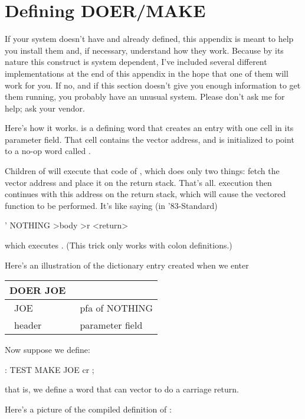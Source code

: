 \chapter{Defining
DOER/MAKE}
\initial If your system doesn't have  and 
already defined, this appendix is meant to help you install them and,
if necessary, understand how they work.  Because by its nature this
construct is system dependent, I've included several different
implementations at the end of this appendix in the hope that one of
them will work for you.  If no, and if this section doesn't give you
enough information to get them running, you probably have an unusual
system.  Please don't ask me for help; ask your \Forth{} vendor.

Here's how it works.   is a defining word that creates an
entry with one cell in its parameter field. That cell contains the vector
address, and is initialized to point to a no-op word called
.

Children of  will execute that  code of
, which does only two things:  fetch the vector address and
place it on the return stack.  That's all.  \Forth{} execution then
continues with this address on the return stack, which will cause the
vectored function to be performed.  It's like saying (in '83-Standard)
\begin{Code}
' NOTHING >body >r <return>
\end{Code}
which executes .  (This trick only works with colon
definitions.)

Here's an illustration of the dictionary entry created when we enter

{\sf
\bigskip
\begin{tabular}{@{} l l@{}}
DOER JOE & \\
\hline
\vline\ JOE & \vline\ pfa of NOTHING \vline \\
\hline
\ header &\  parameter field
\end{tabular}
\bigskip
}

\noindent Now suppose we define:
\begin{Code}
: TEST   MAKE JOE  cr ;
\end{Code}
that is, we define a word that can vector  to do a carriage
return.

Here's a picture of the compiled definition of :

